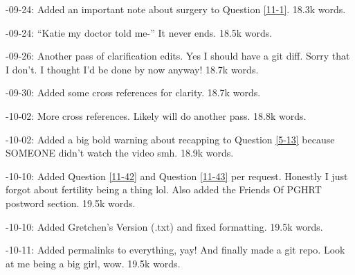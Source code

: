 \documentclass{article}
\begin{document}
-09-24: Added an important note about surgery to Question \ref{11-1}. 18.3k words.

-09-24: “Katie my doctor told me-” It never ends. 18.5k words.

-09-26: Another pass of clarification edits. Yes I should have a git diff. Sorry that I don't. I thought I'd be done by now anyway! 18.7k words.

-09-30: Added some cross references for clarity. 18.7k words.

-10-02: More cross references. Likely will do another pass. 18.8k words.

-10-02: Added a big bold warning about recapping to Question \ref{5-13} because SOMEONE didn't watch the video smh. 18.9k words.

-10-10: Added Question \ref{11-42} and Question \ref{11-43} per request. Honestly I just forgot about fertility being a thing lol. Also added the Friends Of PGHRT postword section. 19.5k words.

-10-10: Added Gretchen's Version (.txt) and fixed formatting. 19.5k words.

-10-11: Added permalinks to everything, yay! And finally made a git repo. Look at me being a big girl, wow. 19.5k words.
\end{document}
